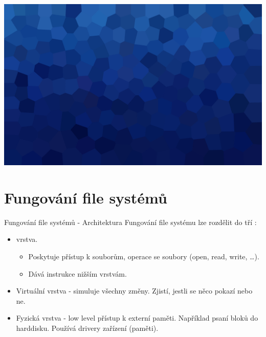 \documentclass[aspectratio=169,xcolor=dvipsnames, t]{beamer}
\begin{document}
{
{
    \includegraphics[width=\paperwidth,height=\paperheight]{AICStyleData/logos/mene_polygonu_bg.png}
}
\section{Fungování file systémů}
\begin{frame}{Fungování file systémů - Architektura}
Fungování file systému lze rozdělit do tří :
\begin{itemize}
    \item {} vrstva.
    \begin{itemize}
        \item Poskytuje přístup k souborům, operace se soubory (open, read, write, \dots).
        \item Dává instrukce nižším vrstvám.
    \end{itemize}
    \item Virtuální vrstva - simuluje všechny změny. Zjistí, jestli se něco pokazí nebo ne.
    \item Fyzická vrstva - low level přístup k externí paměti. Například psaní bloků do harddisku. Používá drivery zařízení (paměti).
\end{itemize}
\end{frame}
}
\end{document}
